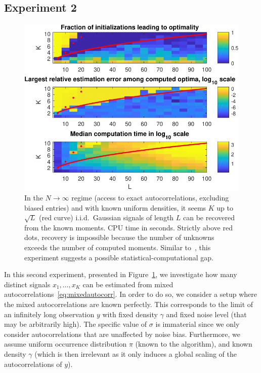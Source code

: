 \documentclass[12pt]{article}
\newcommand{\1}{\mathbf{1}}
\theoremstyle{plain}
\theoremstyle{definition}
\theoremstyle{remark}
\theoremstyle{plain}
\theoremstyle{remark}
\theoremstyle{plain}
\theoremstyle{plain}
\theoremstyle{plain}
\numberwithin{equation}{section}
\begin{document}
\subsection{Experiment 2}

\begin{figure}[t]
	\centering
	\includegraphics[width=.7\linewidth]{KLXP/XP1}
	\caption{In the $N \to \infty$ regime (access to exact autocorrelations, excluding biased entries) and with known uniform densities, it seems $K$ up to $\sqrt{L}$ (red curve) i.i.d.\ Gaussian signals of length $L$ can be recovered from the known moments. CPU time in seconds. Strictly above red dots, recovery is impossible because the number of unknowns exceeds the number of computed moments. Similar to~\cite[Fig.~4.1]{boumal2017heterogeneous}, this experiment suggests a possible statistical-computational gap.}
	\label{fig:KLXP}
\end{figure}

In this second experiment, presented in Figure~\ref{fig:KLXP}, we investigate how many distinct signals ${x_1, \ldots, x_K}$ can be estimated from mixed autocorrelations~\eqref{eq:mixedautocorr}. In order to do so, we consider a setup where the mixed autocorrelations are known perfectly. This corresponds to the limit of an infinitely long observation $y$ with fixed density $\gamma$ and fixed noise level (that may be arbitrarily high). The specific value of $\sigma$ is immaterial since we only consider autocorrelations that are unaffected by noise bias. Furthermore, we assume uniform occurrence distribution $\pi$ (known to the algorithm), and known density $\gamma$ (which is then irrelevant as it only induces a global scaling of the autocorrelations of $y$).
\end{document}
